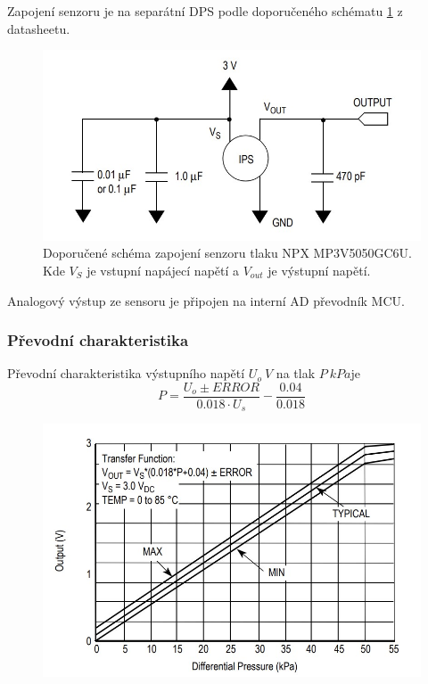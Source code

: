 Zapojení senzoru je na separátní DPS podle doporučeného schématu \ref{fig:nxp_recommended} z datasheetu.
\begin{figure}[H]
    \centering
    \includegraphics[width=0.9\linewidth]{pictures/nxp_recommended.jpg}
    \caption{Doporučené schéma zapojení senzoru tlaku NPX MP3V5050GC6U. Kde $V_S$ je vstupní napájecí napětí a $V_{out}$ je výstupní napětí.}
    \label{fig:nxp_recommended}
\end{figure}
Analogový výstup ze sensoru je připojen na interní AD převodník MCU.
\subsubsection{Převodní charakteristika}
Převodní charakteristika výstupního napětí $U_{o} \ V$ na tlak $P \ kPa$je
\begin{equation}
    P = \frac{U_o \pm ERROR}{0.018 \cdot U_s} - \frac{0.04}{0.018}
    \label{eq:nxp_transfer}
\end{equation}

\begin{figure}[H]
    \centering
    \includegraphics[width=0.9\linewidth]{pictures/nxp_transfer.jpg}
    \caption{}
    \label{fig:nxp_transfer}
\end{figure}

